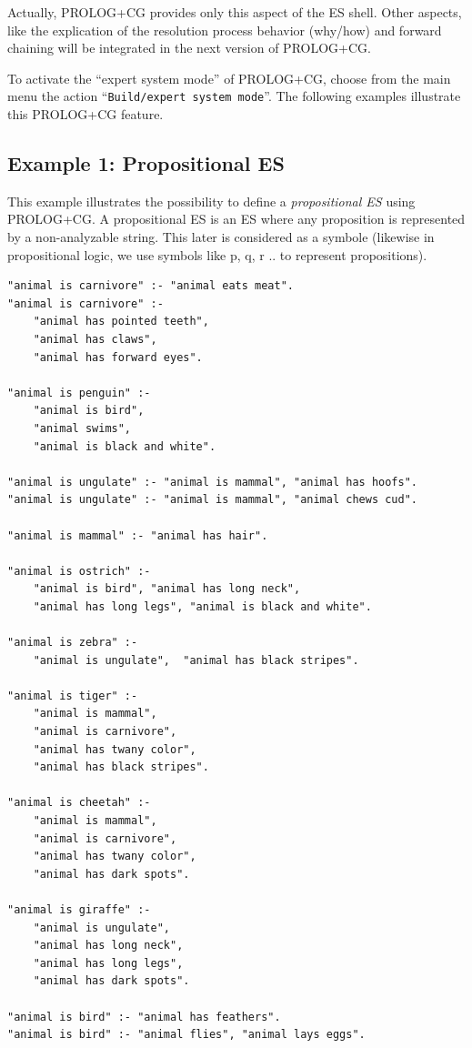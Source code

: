 \documentclass{book}
\begin{document}
Actually, PROLOG+CG provides only this aspect of the ES shell. Other
aspects, like the explication of the resolution process behavior
(why/how) and forward chaining will be integrated in the next version
of PROLOG+CG.

To activate the ``expert system mode'' of PROLOG+CG, choose from the
main menu the action ``\texttt{Build/expert system mode}''. The
following examples illustrate this PROLOG+CG feature.

\subsection{Example 1: Propositional ES}

This example illustrates the possibility to define a {\it
propositional ES} using PROLOG+CG. A propositional ES is an ES where
any proposition is represented by a non-analyzable string. This later
is considered as a symbole (likewise in propositional logic, we use
symbols like p, q, r .. to represent propositions).


\begin{verbatim}
"animal is carnivore" :- "animal eats meat".
"animal is carnivore" :-
    "animal has pointed teeth",
    "animal has claws",
    "animal has forward eyes".

"animal is penguin" :-
    "animal is bird",
    "animal swims",
    "animal is black and white".

"animal is ungulate" :- "animal is mammal", "animal has hoofs".
"animal is ungulate" :- "animal is mammal", "animal chews cud".

"animal is mammal" :- "animal has hair".

"animal is ostrich" :- 
    "animal is bird", "animal has long neck",
    "animal has long legs", "animal is black and white".

"animal is zebra" :- 
    "animal is ungulate",  "animal has black stripes".

"animal is tiger" :-
    "animal is mammal",
    "animal is carnivore",
    "animal has twany color",
    "animal has black stripes".

"animal is cheetah" :-
    "animal is mammal",
    "animal is carnivore",
    "animal has twany color",
    "animal has dark spots".

"animal is giraffe" :-
    "animal is ungulate",
    "animal has long neck",
    "animal has long legs",
    "animal has dark spots".

"animal is bird" :- "animal has feathers".
"animal is bird" :- "animal flies", "animal lays eggs".
\end{verbatim}
\end{document}
